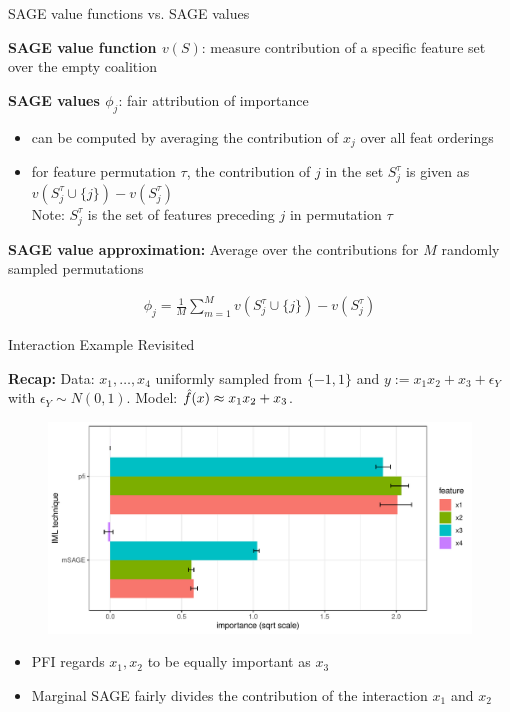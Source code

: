 \documentclass[10pt,compress,t,notes=noshow, xcolor=table]{beamer}
\newcommand{\Stau}{S_{j}^\tau}%
\newcommand{\Stauj}{\Stau \cup \{j\}}
\begin{document}
\begin{frame}{SAGE value functions vs. SAGE values}

\textbf{SAGE value function $v(S)$}: measure contribution of a specific feature set over the empty coalition

\lz\pause

\textbf{SAGE values $\phi_j$}: fair attribution of importance
\begin{itemize}
    \item can be computed by averaging the contribution of $x_j$ over all feat orderings
    \item for feature permutation $\tau$, the contribution of $j$ in the set $\Stau$ is given as $v(\Stauj) - v(\Stau)$\\
    Note: $\Stau$ is the set of features preceding $j$ in permutation $\tau$
\end{itemize}

\lz\pause

\textbf{SAGE value approximation:} Average over the contributions for $M$ randomly sampled permutations

\begin{align*}
    \phi_j = \frac{1}{M} \sum_{m=1}^M v(\Stauj) - v(\Stau)
\end{align*}
    
\end{frame}

\begin{frame}{Interaction Example Revisited}

\textbf{Recap:} Data: $x_1, \dots, x_4$ uniformly sampled from $\{-1, 1\}$ and $y:= x_1 x_2 + x_3 + \epsilon_Y$ with $\epsilon_Y \sim N(0, 1)$. Model: $\hat{f}(x) \approx x_1 x_2 + x_3$.\\
%
\begin{figure}
  \includegraphics[width=0.65\linewidth]{figure_man/sage_pfi_interactions}
\end{figure}
%
\begin{itemize}
    \item PFI regards $x_1, x_2$ to be equally important as $x_3$
    \item Marginal SAGE fairly divides the contribution of the interaction $x_1$ and $x_2$
\end{itemize}

\end{frame}
\end{document}
